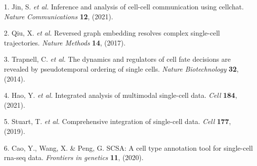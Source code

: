 \documentclass[
]{article}
\newenvironment{cslreferences}%
  {}%
  {\par}
\begin{document}
\hypertarget{refs}{}
\begin{cslreferences}
\leavevmode\hypertarget{ref-InferenceAndAJinS2021}{}%
1. Jin, S. \emph{et al.} Inference and analysis of cell-cell communication using cellchat. \emph{Nature Communications} \textbf{12}, (2021).

\leavevmode\hypertarget{ref-ReversedGraphQiuX2017}{}%
2. Qiu, X. \emph{et al.} Reversed graph embedding resolves complex single-cell trajectories. \emph{Nature Methods} \textbf{14}, (2017).

\leavevmode\hypertarget{ref-TheDynamicsAnTrapne2014}{}%
3. Trapnell, C. \emph{et al.} The dynamics and regulators of cell fate decisions are revealed by pseudotemporal ordering of single cells. \emph{Nature Biotechnology} \textbf{32}, (2014).

\leavevmode\hypertarget{ref-IntegratedAnalHaoY2021}{}%
4. Hao, Y. \emph{et al.} Integrated analysis of multimodal single-cell data. \emph{Cell} \textbf{184}, (2021).

\leavevmode\hypertarget{ref-ComprehensiveIStuart2019}{}%
5. Stuart, T. \emph{et al.} Comprehensive integration of single-cell data. \emph{Cell} \textbf{177}, (2019).

\leavevmode\hypertarget{ref-ScsaACellTyCaoY2020}{}%
6. Cao, Y., Wang, X. \& Peng, G. SCSA: A cell type annotation tool for single-cell rna-seq data. \emph{Frontiers in genetics} \textbf{11}, (2020).
\end{cslreferences}
\end{document}
